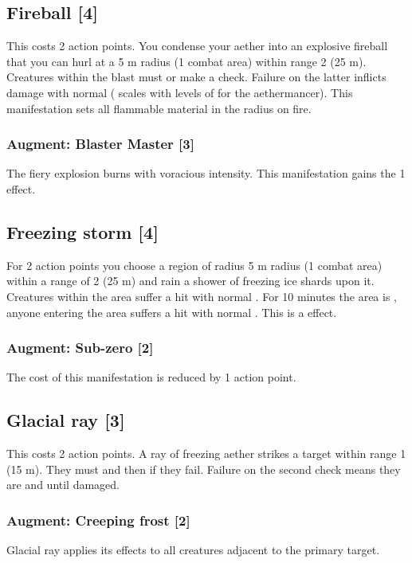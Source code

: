 \subsection{Fireball [4]}
This costs 2 action points. You condense your aether into an explosive fireball that you can hurl at a 5 m radius (1 combat area) within range 2 (25 m). Creatures within the blast must  or make a  check. Failure on the latter inflicts damage with normal  ( scales with levels of  for the aethermancer). This manifestation sets all flammable material in the radius on fire.
\subsubsection{Augment: Blaster Master [3]}
The fiery explosion burns with voracious intensity. This manifestation gains the  1 effect.


\subsection{Freezing storm [4]}
For 2 action points you choose a region of radius 5 m radius (1 combat area) within a range of 2 (25 m) and rain a shower of freezing ice shards upon it. Creatures within the area suffer a hit with normal . For 10 minutes the area is , anyone entering the area suffers a hit with normal . This is a  effect.
\subsubsection{Augment: Sub-zero [2]}
The cost of this manifestation is reduced by 1 action point.


\subsection{Glacial ray [3]}
This costs 2 action points. A ray of freezing aether strikes a target within range 1 (15 m). They must  and then  if they fail. Failure on the second check means they are  and  until damaged. 
\subsubsection{Augment: Creeping frost [2]}
Glacial ray applies its effects to all creatures adjacent to the primary target.

